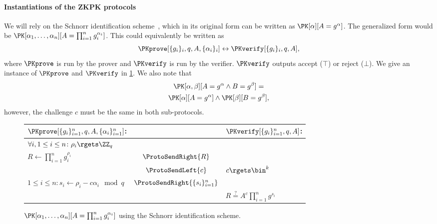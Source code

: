 \paragraph*{Instantiations of the \acs{ZKPK} protocols}

We will rely on the Schnorr identification scheme~\cite{Schnorr}, which in its 
original form can be written as \(\PK[\alpha][A = g^\alpha]\).
The generalized form would be \(\PK[\alpha_1, \dotsc, \alpha_n][A = 
    \prod_{i=1}^n g_i^{\alpha_i}]\).
This could equivalently be written as
\begin{equation*}
  \PKprove[\{g_i\}_i, q, A, \{\alpha_i\}_i] \leftrightarrow
  \PKverify[\{g_i\}_i, q, A],
\end{equation*}
where \(\PKprove\) is run by the prover and \(\PKverify\) is run by the 
verifier.
\(\PKverify\) outputs accept (\(\top\)) or reject (\(\bot\)).
We give an instance of \(\PKprove\) and \(\PKverify\) in \cref{PKalgorithms}.
We also note that
\begin{multline*}
  \PK[\alpha, \beta][A = g^\alpha \land B = g^\beta] = \\
  \PK[\alpha][A = g^\alpha] \land \PK[\beta][B = g^\beta],
\end{multline*}
however, the challenge \(c\) must be the same in both sub-protocols.

\begin{figure*}
  \centering
  \begin{tabular}{lcl}
    \(\PKprove[\{g_i\}_{i=1}^n, q, A, \{\alpha_i\}_{i=1}^n]\):
    &
    & \(\PKverify[\{g_i\}_{i=1}^n, q, A]\):
    \\
    \midrule

    \(\forall i, 1\leq i\leq n\colon \rho_i\rgets \ZZ_q\)
    &
    &
    \\

    \(R\gets \prod_{i=1}^n g_i^{\rho_i}\)
    & \(\ProtoSendRight{R}\)
    &
    \\

    & \(\ProtoSendLeft{c}\)
    & \(c\rgets \bin^k\)
    \\

    \(1\leq i\leq n\colon s_i\gets \rho_i - c\alpha_i \mod q\)
    & \(\ProtoSendRight{\{s_i\}_{i=1}^n}\)
    &
    \\

    &
    & \(R \stackrel{?}{=} A^c \prod_{i=1}^n g^{s_i}\)
    \\
    
  \end{tabular}
  \caption{%
    \(\PK[\alpha_1, \dotsc, \alpha_n][A = \prod_{i=1}^n g_i^{\alpha_i}]\) using 
    the Schnorr identification scheme.
  }%
  \label{PKalgorithms}
\end{figure*}

